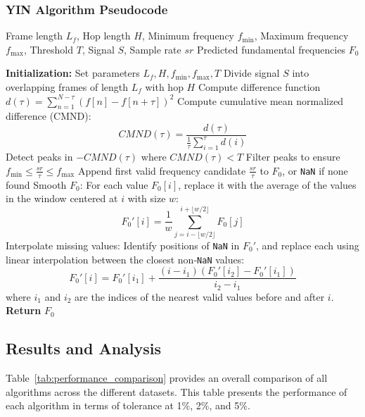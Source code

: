 \documentclass{ieeeaccess}
\begin{document}
\subsubsection{YIN Algorithm Pseudocode}
\begin{algorithmic}[1]
\vspace{5pt} \hline \vspace{5pt}
\REQUIRE Frame length $L_f$, Hop length $H$, Minimum frequency $f_{\text{min}}$, Maximum frequency $f_{\text{max}}$, Threshold $T$, Signal $S$, Sample rate $sr$
\vspace{5pt} \hline \vspace{5pt}
\ENSURE Predicted fundamental frequencies $F_0$

\STATE \textbf{Initialization:} Set parameters $L_f, H, f_{\text{min}}, f_{\text{max}}, T$
\STATE Divide signal $S$ into overlapping frames of length $L_f$ with hop $H$
    \STATE Compute difference function $d(\tau) = \sum_{n=1}^{N-\tau} (f[n] - f[n+\tau])^2$
    \STATE Compute cumulative mean normalized difference (CMND): \\
           \[ 
           CMND(\tau) = \frac{d(\tau)}{\frac{1}{\tau} \sum_{i=1}^\tau d(i)}
           \]
    \STATE Detect peaks in $-CMND(\tau)$ where $CMND(\tau) < T$
    \STATE Filter peaks to ensure $f_{\text{min}} \leq \frac{sr}{\tau} \leq f_{\text{max}}$
    \STATE Append first valid frequency candidate $\frac{sr}{\tau}$ to $F_0$, or \texttt{NaN} if none found
\ENDFOR
\STATE Smooth $F_0$: For each value $F_0[i]$, replace it with the average of the values in the window centered at $i$ with size $w$: 
        \[
        F_0'[i] = \frac{1}{w} \sum_{j=i-\lfloor w/2 \rfloor}^{i+\lfloor w/2 \rfloor} F_0[j]
        \]
\STATE Interpolate missing values: Identify positions of \texttt{NaN} in $F_0'$, and replace each using linear interpolation between the closest non-\texttt{NaN} values:
       \[
       F_0'[i] = F_0'[i_1] + \frac{(i - i_1)(F_0'[i_2] - F_0'[i_1])}{i_2 - i_1}
       \]
       where $i_1$ and $i_2$ are the indices of the nearest valid values before and after $i$.
\STATE \textbf{Return} $F_0$
\vspace{5pt} \hline \vspace{5pt}
\end{algorithmic}


\subsection{Results and Analysis}
Table~\ref{tab:performance_comparison} provides an overall comparison of all algorithms across the different datasets. This table presents the performance of each algorithm in terms of tolerance at 1\%, 2\%, and 5\%.
\end{document}

